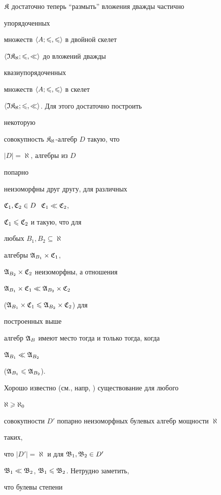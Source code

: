 \begin{pf}
$\frak K$ достаточно теперь ``размыть'' вложения дважды частично


упорядоченных


множеств $\langle A;\leqslant,\leqslant\rangle$ в двойной скелет


$\langle\frak I\frak K_{\aleph};\leqslant,\ll\rangle$ до вложений дважды


квазиупорядоченных


множеств $\langle A;\leqslant,\leqslant\rangle$ в скелет


$\langle\frak I\frak K_{\aleph};\leqslant,\ll\rangle$. Для этого достаточно построить


некоторую


совокупность $\frak K_{\aleph}$-алгебр $D$ такую, что


$|D|=\aleph$, алгебры из $D$


попарно


неизоморфны друг другу, для различных


$\frak C_1,\frak C_2\in D\;$ $\frak C_1\ll\frak C_2$,


$\frak C_1\leqslant\frak C_2$ и такую, что для


любых $B_1,B_2\subseteq\aleph$


алгебры $\frak A_{B_1}\times\frak C_1$,


$\frak A_{B_2}\times\frak C_2$ неизоморфны, а отношения


$\frak A_{B_1}\times\frak C_1\ll\frak A_{B_2}\times\frak C_2$


($\frak A_{B_1}\times\frak C_1\leqslant\frak A_{B_2}\times\frak C_2$) для


построенных выше


алгебр $\frak A_B$ имеют место тогда и только тогда, когда


$\frak A_{B_1}\ll\frak A_{B_2}$


($\frak A_{B_1}\leqslant\frak A_{B_2}$).





Хорошо известно (см., напр, \cite{P1}) существование для любого


$\aleph\geqslant\aleph_0$


совокупности $D'$ попарно неизоморфных булевых алгебр мощности $\aleph$


таких,


что $|D'|=\aleph$ и для $\frak B_1,\frak B_2\in D'$


$\frak B_1\ll\frak B_2$, $\frak B_1\leqslant\frak B_2$. Нетрудно заметить,


что булевы степени



\end{pf}
